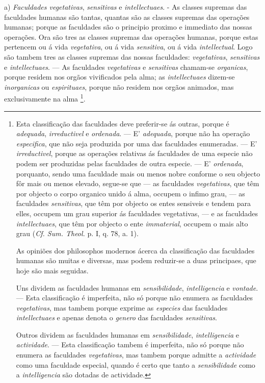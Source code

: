 a) \emph{Faculdades vegetativas}, \emph{sensitivas} e \emph{intellectuaes}. - As classes supremas das faculdades humanas são tantas, quantas são as classes supremas das operações humanas; porque as faculdades são o principio proximo e immediato das nossas operações. Ora são tres as classes supremas das operações humanas, porque estas pertencem ou á vida \emph{vegetativa}, ou á vida \emph{sensitiva}, ou á vida \emph{intellectual}. Logo são tambem tres as classes supremas das nossas faculdades: \emph{vegetativas}, \emph{sensitivas} e \emph{intellectuaes}. --- As faculdades \emph{vegetativas} e \emph{sensitivas} chamam-se \emph{organicas}, porque residem nos orgãos vivificados pela alma; as \emph{intellectuaes} dizem-se \emph{inorganicas} ou \emph{espirituaes}, porque não residem nos orgãos animados, mas exclusivamente na alma \footnote{Esta classificação das faculdades deve preferir-se ás outras, porque é \emph{adequada}, \emph{irreductivel} e \emph{ordenada}. --- E' \emph{adequada}, porque não ha operação \emph{especifica}, que não seja produzida por uma das faculdades enumeradas. --- E' \emph{irreductivel}, porque as operações relativas ás faculdades de uma especie não podem ser produzidas pelas faculdades de outra especie. --- E' \emph{ordenada}, porquanto, sendo uma faculdade mais ou menos nobre conforme o seu objecto fôr mais ou menos elevado, segue-se que --- as faculdades \emph{vegetativas}, que têm por objecto o corpo organico unido á alma, occupem o infimo grau, --- as faculdades \emph{sensitivas}, que têm por objecto os entes sensiveis e tendem para elles, occupem um grau superior ás faculdades vegetativas, --- e as faculdades \emph{intellectuaes}, que têm por objecto o ente \emph{immaterial}, occupem o mais alto grau (\emph{Cf. Sum. Theol.} p. I, q. 78, a. 1).\par As opiniões dos philosophos modernos ácerca da classificação das faculdades humanas são muitas e diversas, mas podem reduzir-se a duas principaes, que hoje são mais seguidas.\par Uns dividem as faculdades humanas em \emph{sensibilidade}, \emph{intelligencia} e \emph{vontade}. --- Esta classificação é imperfeita, não só porque não enumera as faculdades \emph{vegetativas}, mas tambem porque exprime as \emph{especies} das faculdades \emph{intellectuaes} e apenas denota o \emph{genero} das faculdades \emph{sensitivas}.\par Outros dividem as faculdades humanas em \emph{sensibilidade}, \emph{intelligencia} e \emph{actividade}. --- Esta classificação tambem é imperfeita, não só porque não enumera as faculdades \emph{vegetativas}, mas tambem porque admitte a \emph{actividade} como uma faculdade especial, quando é certo que tanto a \emph{sensibilidade} como a \emph{intelligencia} são dotadas de actividade.}.


